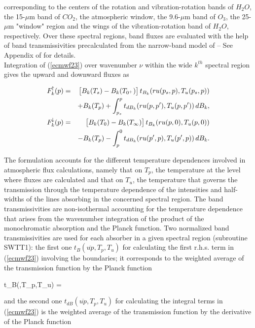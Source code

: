\noindent corresponding to the centers of the rotation and vibration-rotation bands of $H_2O$, the 15-$\mu$m band of $CO_2$, the atmospheric window, the 9.6-$\mu$m band of $O_3$, the 25-$\mu$m "window" region and the wings of the vibration-rotation band of $H_2O$, respectively. Over these spectral regions, band fluxes are evaluated with the help of band transmissivities precalculated from the narrow-band model of \citet{Morcrette1985} -- See Appendix of \citet{Morcrette1986} for details.\\

Integration of (\ref{ecmwf23}) over wavenumber $\nu$ within the wide $k^{th}$
spectral region gives the upward and downward fluxes as

\medskip
\begin{eqnarray}\label{ecmwf25}
F_{k}^{\!\uparrow}(p) &=&
\bigl[B_{k}(T_s) - B_{k}(T_{0^{+}})\bigr] \, t_{B_k}(ru(p_s,p),T_u(p_s,p))\cr & &
+ B_{k}(T_p)+ \int_{p_s}^p{t_{dB_k}(ru(p,p'),T_u(p,p')) \, dB_{k}}, \cr
F_{k}^{\!\downarrow}(p) &=&
\bigl[B_{k}(T_0) - B_{k}(T_{\infty})\bigr] \, t_{B_k}(ru(p,0),T_u(p,0))\cr & &
- B_{k}(T_p)  - \int_{p}^0{t_{dB_k}(ru(p',p),T_u(p',p)) \, dB_{k}}.
\end{eqnarray}
\medskip

The formulation accounts for the different temperature dependences involved in atmospheric flux calculations, namely that on $T_p$, the temperature at the level where fluxes are calculated and that on $T_u$, the temperature that governs the transmission through the temperature dependence of the intensities and half-widths of the lines absorbing in the concerned spectral region. The band transmissivities are non-isothermal accounting for the temperature dependence that arises from the wavenumber integration of the product of the monochromatic absorption and the Planck function. Two normalized band transmissivities are used for each absorber in a given spectral region (subroutine SWTT1): the first one $t_B(\overline{up},T_p,T_u)$ for calculating the first r.h.s. term in (\ref{ecmwf23}) involving the boundaries; it corresponds to the weighted average of the transmission function by the Planck function

\medskip
\be
t_B(,T_p,T_u) = 
\label{ecmwf26a}
\ee
\medskip

\noindent and the second one $t_{dB}(\overline{up},T_p,T_u)$ for calculating the integral terms in (\ref{ecmwf23}) is the weighted average of the transmission function by the derivative of the Planck function

